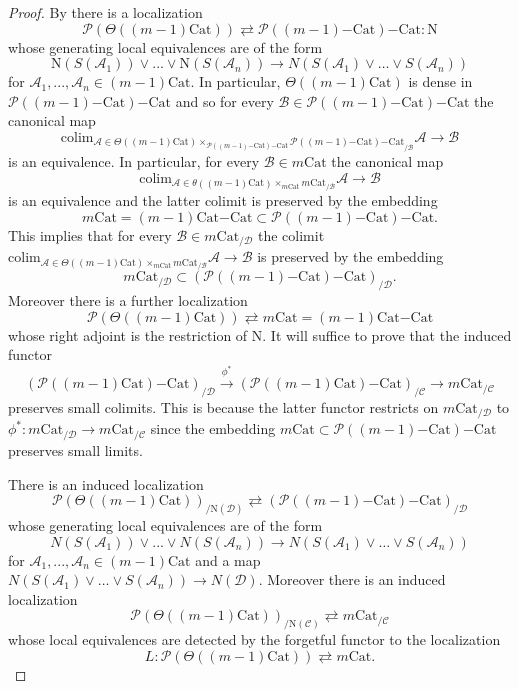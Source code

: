 \documentclass[10pt,oneside]{article}
\numberwithin{equation}{section} %
\numberwithin{figure}{section} %
\theoremstyle{plain}
\theoremstyle{definition}
\newcommand{\mA}{{\mathcal A}}
\newcommand{\mB}{{\mathcal B}}
\newcommand{\mC}{{\mathcal C}}
\newcommand{\mD}{{\mathcal D}}
\newcommand{\mP}{{\mathcal P}}
\newcommand{\N}{{\mathrm N}}
\newcommand{\colim}{\mathrm{colim}}
\newcommand{\Cat}{\mathrm{Cat}}
\begin{document}
\begin{proof}

By \cite[Theorem 2.4.8.]{GepnerHeine2026} there is a localization
$$\mP(\Theta((m-1)\Cat)) \rightleftarrows {{\mP((m-1)\mathrm{-}\Cat)}\mathrm{-}\Cat} : \N$$
whose generating local equivalences are of the form
$$ \N(S(\mA_1)) \vee ... \vee \N(S(\mA_n)) \to N(S(\mA_1) \vee \ldots \vee S(\mA_n))$$ for $\mA_1,..., \mA_n \in (m-1)\Cat $.
In particular, $\Theta((m-1)\Cat)$ is dense in ${{\mP((m-1)\mathrm{-}\Cat)}\mathrm{-}\Cat}$
and so for every $\mB \in {{\mP((m-1)\mathrm{-}\Cat)}\mathrm{-}\Cat}$ the canonical map 
$$ \colim_{\mA \in \Theta((m-1)\Cat) \times_{{{\mP((m-1)\mathrm{-}\Cat)}\mathrm{-}\Cat}} {{\mP((m-1)\mathrm{-}\Cat)}\mathrm{-}\Cat}_{/\mB}} \mA \to \mB$$ is an equivalence.
In particular, for every $\mB \in m\Cat$
the canonical map $$ \colim_{\mA \in \theta((m-1)\Cat) \times_{m\Cat} m\Cat_{/\mB}} \mA \to \mB$$ is an equivalence and the latter 
colimit is preserved by the embedding $$m\Cat= {(m-1)\Cat \mathrm{-}\Cat} \subset {{\mP((m-1)\mathrm{-}\Cat)}\mathrm{-}\Cat}.$$
This implies that for every $\mB \in m\Cat_{/\mD}$
the colimit $ \colim_{\mA \in \Theta((m-1)\Cat) \times_{m\Cat} m\Cat_{/\mB}} \mA \to \mB$ is preserved by the embedding $$ m\Cat_{/\mD} \subset ({{\mP((m-1)\mathrm{-}\Cat)}\mathrm{-}\Cat})_{/\mD}.$$
Moreover there is a further localization
$$ \mP(\Theta((m-1)\Cat)) \rightleftarrows m\Cat= {(m-1)\Cat \mathrm{-}\Cat} $$
whose right adjoint is the restriction of $\N$.
It will suffice to prove that the induced functor
$$({\mP((m-1)\Cat)}\mathrm{-}\Cat)_{/\mD} \xrightarrow{\phi^*}({\mP((m-1)\Cat)}\mathrm{-}\Cat)_{/\mC} \to {m\Cat}_{/\mC} $$ preserves small colimits.
This is because the latter functor restricts on ${m\Cat}_{/\mD} $
to $\phi^* : {m\Cat}_{/\mD} \to {m\Cat}_{/\mC}$ since the embedding
${m\Cat} \subset {{\mP((m-1)\mathrm{-}\Cat)}\mathrm{-}\Cat}$ preserves small limits.

There is an induced localization
$$\mP(\Theta((m-1)\Cat))_{/\N(\mD)} \rightleftarrows ({{\mP((m-1)\mathrm{-}\Cat)}\mathrm{-}\Cat})_{/\mD}$$
whose generating local equivalences are of the form
$$ N(S(\mA_1)) \vee ... \vee N(S(\mA_n)) \to N(S(\mA_1) \vee \ldots \vee S(\mA_n))$$ for $\mA_1,..., \mA_n \in (m-1)\Cat $ and a map
$ N(S(\mA_1) \vee \ldots \vee S(\mA_n)) \to N(\mD).$
Moreover there is an induced localization
$$\mP(\Theta((m-1)\Cat))_{/\N(\mC)} \rightleftarrows m\Cat_{/\mC}$$
whose local equivalences are detected by the forgetful functor
to the localization $$L: \mP(\Theta((m-1)\Cat)) \rightleftarrows m\Cat.$$


\end{proof}
\end{document}

